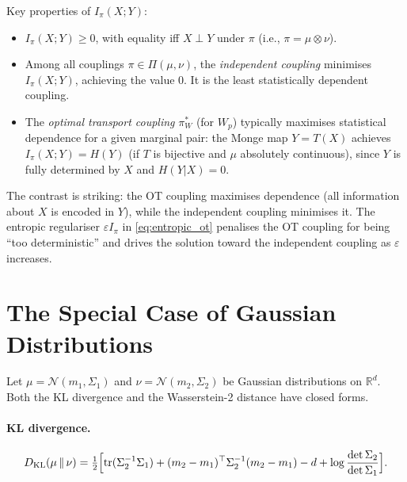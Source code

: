 \documentclass[12pt]{article}
\newcommand{\KL}[2]{D_{\mathrm{KL}}\!\left(#1\,\|\,#2\right)}
\newcommand{\R}{\mathbb{R}}
\begin{document}
Key properties of $I_\pi(X;Y)$:
\begin{itemize}
  \item $I_\pi(X;Y) \geq 0$, with equality iff $X \perp Y$
    under $\pi$ (i.e., $\pi = \mu \otimes \nu$).
  \item Among all couplings $\pi \in \Pi(\mu,\nu)$, the
    \emph{independent coupling} minimises $I_\pi(X;Y)$,
    achieving the value $0$.  It is the least statistically
    dependent coupling.
  \item The \emph{optimal transport coupling} $\pi^*_W$
    (for $W_p$) typically maximises statistical dependence
    for a given marginal pair: the Monge map $Y = T(X)$
    achieves $I_\pi(X;Y) = H(Y)$ (if $T$ is bijective and
    $\mu$ absolutely continuous), since $Y$ is fully determined
    by $X$ and $H(Y|X) = 0$.
\end{itemize}
The contrast is striking: the OT coupling maximises dependence
(all information about $X$ is encoded in $Y$), while the
independent coupling minimises it.  The entropic regulariser
$\varepsilon I_\pi$ in \eqref{eq:entropic_ot} penalises the
OT coupling for being ``too deterministic'' and drives the
solution toward the independent coupling as $\varepsilon$
increases.

\section{The Special Case of Gaussian Distributions}
\label{app:gaussian}

Let $\mu = \mathcal{N}(m_1, \Sigma_1)$ and
$\nu = \mathcal{N}(m_2, \Sigma_2)$ be Gaussian distributions
on $\R^d$.  Both the KL divergence and the Wasserstein-2
distance have closed forms.

\paragraph{KL divergence.}
\begin{equation}\label{eq:kl_gaussian}
  \KL{\mu}{\nu}
  = \tfrac{1}{2}\Bigl[
    \mathrm{tr}(\Sigma_2^{-1}\Sigma_1)
    + (m_2 - m_1)^\top \Sigma_2^{-1}(m_2 - m_1)
    - d
    + \log\frac{\det\Sigma_2}{\det\Sigma_1}
  \Bigr].
\end{equation}
\end{document}
